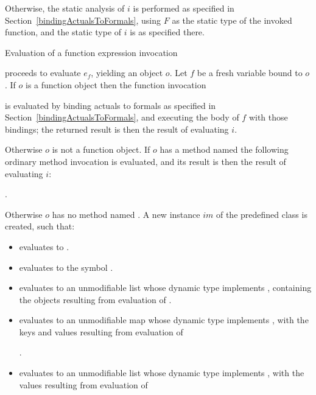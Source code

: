 \documentclass[makeidx]{article}
\begin{document}
{\LMHash{}%
Otherwise, the static analysis of $i$ is performed as specified
in Section~\ref{bindingActualsToFormals},
using $F$ as the static type of the invoked function,
and the static type of $i$ is as specified there.

\LMHash{}%
Evaluation of a function expression invocation

\noindent
{}

\noindent
proceeds to evaluate $e_f$, yielding an object $o$.
Let $f$ be a fresh variable bound to $o$.
If $o$ is a function object then the function invocation

\noindent
{}

\noindent
is evaluated by binding actuals to formals
as specified in Section~\ref{bindingActualsToFormals},
and executing the body of $f$ with those bindings;
the returned result is then the result of evaluating $i$.

\LMHash{}%
Otherwise $o$ is not a function object.
If $o$ has a method named \CALL{}
the following ordinary method invocation is evaluated,
and its result is then the result of evaluating $i$:

\noindent
{}.

\LMHash{}%
Otherwise $o$ has no method named \CALL.
A new instance $im$ of the predefined class  is created,
such that:

\begin{itemize}
\item {} evaluates to \TRUE.
\item {} evaluates to the symbol .
\item {} evaluates to an unmodifiable list
  whose dynamic type implements ,
  containing the objects resulting from evaluation of
  .
\item {} evaluates to an unmodifiable map
  whose dynamic type implements ,
  with the keys and values resulting from evaluation of

  .
\item {} evaluates to an unmodifiable list
  whose dynamic type implements ,
  with the values resulting from evaluation of


\end{itemize}}
\end{document}
